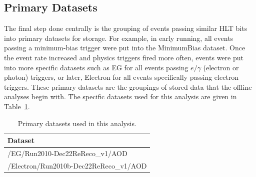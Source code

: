 

\subsection{Primary Datasets}
\label{evSel:PD}
The final step done centrally is the grouping of events passing similar 
HLT bits into primary datasets for storage.  
For example, in early running, all events passing a minimum-bias trigger 
were put into the MinimumBias dataset.  
Once the event rate increased and physics triggers fired more often, 
events were put into more specific datasets such as 
EG for all events passing $e/\gamma$ (electron or photon) triggers, 
or later, Electron for all events specifically passing 
electron triggers.  
These primary datasets are the groupings of stored data 
that the offline analyses begin with.  
The specific datasets used for this analysis are given in 
Table~\ref{TableDatasets}.  

\begin{table}[htbp]
  \begin{center}
    \caption{Primary datasets used in this analysis.}
    \label{TableDatasets}
    \begin{tabular}[]{ | l | }
      \hline
      Dataset  \\ \hline \hline
      /EG/Run2010-Dec22ReReco\_v1/AOD  \\ \hline
      /Electron/Run2010b-Dec22ReReco\_v1/AOD  \\ \hline
    \end{tabular}
  \end{center}
\end{table}

\clearpage
